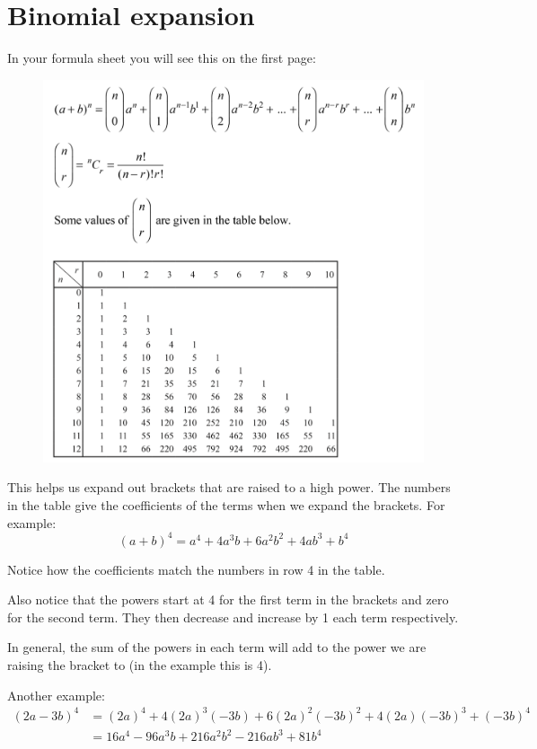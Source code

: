 \documentclass[../main.tex]{subfiles}
\begin{document}
\section{Binomial expansion}

In your formula sheet you will see this on the first page:
\begin{figure}[h]
    \centering
    \includegraphics[width=0.75\linewidth]{images/binomial.png}
\end{figure}

This helps us expand out brackets that are raised to a high power.
The numbers in the table give the coefficients of the terms when we expand the brackets.
For example:
\[(a + b)^4 = a^4 + 4a^3 b + 6a^2 b^2 + 4a b^3 + b^4\]

Notice how the coefficients match the numbers in row 4 in the table.

Also notice that the powers start at 4 for the first term in the brackets and zero for the second term. They then decrease and increase by 1 each term respectively.

In general, the sum of the powers in each term will add to the power we are raising the bracket to (in the example this is 4).

Another example:
\begin{equation*}
\begin{split}
    (2a - 3b)^4 &= (2a)^4 + 4(2a)^3 (-3b) + 6(2a)^2 (-3b)^2 + 4(2a)(-3b)^3 + (-3b)^4 \\
&= 16a^4 -96a^3 b + 216a^2 b^2 - 216ab^3 + 81b^4
\end{split}
\end{equation*}
\end{document}
